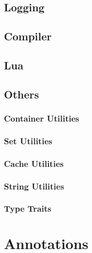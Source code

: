 \subsection{Logging}
\subsection{Compiler}
\subsection{Lua}
\subsection{Others}
\subsubsection{Container Utilities}
\subsubsection{Set Utilities}
\subsubsection{Cache Utilities}
\subsubsection{String Utilities}
\subsubsection{Type Traits}






\section{Annotations}
\label{sec:Compiler.Core.Annotations}



